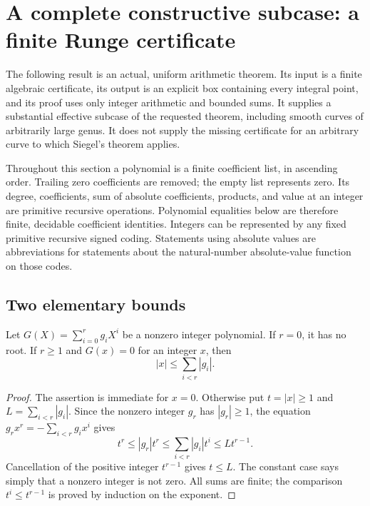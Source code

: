 \section{A complete constructive subcase: a finite Runge certificate}
\label{sec:runge-certificate}

The following result is an actual, uniform arithmetic theorem.  Its input is
a finite algebraic certificate, its output is an explicit box containing every
integral point, and its proof uses only integer arithmetic and bounded sums.
It supplies a substantial effective subcase of the requested theorem, including
smooth curves of arbitrarily large genus.  It does not supply the missing
certificate for an arbitrary curve to which Siegel's theorem applies.

Throughout this section a polynomial is a finite coefficient list, in ascending
order.  Trailing zero coefficients are removed; the empty list represents zero.
Its degree, coefficients, sum of absolute coefficients, products, and value at
an integer are primitive recursive operations.  Polynomial equalities below
are therefore finite, decidable coefficient identities.  Integers can be
represented by any fixed primitive recursive signed coding.  Statements using
absolute values are abbreviations for statements about the natural-number
absolute-value function on those codes.

\subsection{Two elementary bounds}

\begin{lemma}
\label{lem:runge-root-bound}
Let $G(X)=\sum_{i=0}^{r}g_iX^i$ be a nonzero integer polynomial.  If $r=0$,
it has no root.  If $r\geq1$ and $G(x)=0$ for an integer $x$, then
\[
 |x|\leq \sum_{i<r}|g_i|.
\]
\end{lemma}
\begin{proof}
The assertion is immediate for $x=0$.  Otherwise put $t=|x|\geq1$ and
$L=\sum_{i<r}|g_i|$.  Since the nonzero integer $g_r$ has $|g_r|\geq1$,
the equation $g_rx^r=-\sum_{i<r}g_ix^i$ gives
\[
 t^r\leq |g_r|t^r
   \leq\sum_{i<r}|g_i|t^i
   \leq L t^{r-1}.
\]
Cancellation of the positive integer $t^{r-1}$ gives $t\leq L$.  The constant
case says simply that a nonzero integer is not zero.  All sums are finite;
the comparison $t^i\leq t^{r-1}$ is proved by induction on the exponent.
\end{proof}

